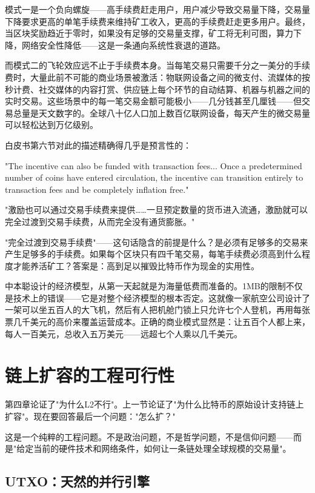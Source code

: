 \documentclass[a4paper,12pt,openany]{ctexbook}
\newenvironment{quoting}{%
  \par\vspace{0.5em}%
  \begin{list}{}{%
    \setlength{\leftmargin}{2em}%
    \setlength{\rightmargin}{2em}%
    \setlength{\parsep}{0.3em}%
    \setlength{\itemsep}{0pt}%
    \setlength{\topsep}{0pt}%
  }%
  \item\relax
}{%
  \end{list}%
  \par\vspace{0.5em}%
}
\begin{document}
模式一是一个负向螺旋——高手续费赶走用户，用户减少导致交易量下降，交易量下降要求更高的单笔手续费来维持矿工收入，更高的手续费赶走更多用户。最终，当区块奖励趋近于零时，如果没有足够的交易量支撑，矿工将无利可图，算力下降，网络安全性降低——这是一条通向系统性衰退的道路。

而模式二的飞轮效应远不止于手续费本身。当每笔交易只需要千分之一美分的手续费时，大量此前不可能的商业场景被激活：物联网设备之间的微支付、流媒体的按秒计费、社交媒体的内容打赏、供应链上每个环节的自动结算、机器与机器之间的实时交易。这些场景中的每一笔交易金额可能极小——几分钱甚至几厘钱——但交易总量是天文数字的。全球八十亿人口加上数百亿联网设备，每天产生的微交易量可以轻松达到万亿级别。

白皮书第六节对此的描述精确得几乎是预言性的：


\begin{quoting}
\small
"The incentive can also be funded with transaction fees... Once a predetermined number of coins have entered circulation, the incentive can transition entirely to transaction fees and be completely inflation free."

"激励也可以通过交易手续费来提供……一旦预定数量的货币进入流通，激励就可以完全过渡到交易手续费，从而完全没有通货膨胀。"
\end{quoting}


"完全过渡到交易手续费"——这句话隐含的前提是什么？是必须有足够多的交易来产生足够多的手续费。如果每个区块只有四千笔交易，每笔手续费必须高到什么程度才能养活矿工？答案是：高到足以摧毁比特币作为现金的实用性。

中本聪设计的经济模型，从第一天起就是为海量低费而准备的。1MB的限制不仅是技术上的错误——它是对整个经济模型的根本否定。这就像一家航空公司设计了一架可以坐五百人的大飞机，然后有人把机舱门锁上只允许七个人登机，再用每张票几千美元的高价来覆盖运营成本。正确的商业模式显然是：让五百个人都上来，每人一百美元，总收入五万美元——远超七个人乘以几千美元。


\section*{链上扩容的工程可行性}


第四章论证了"为什么L2不行"。上一节论证了"为什么比特币的原始设计支持链上扩容"。现在要回答最后一个问题："怎么扩？"

这是一个纯粹的工程问题。不是政治问题，不是哲学问题，不是信仰问题——而是"给定当前的硬件技术和网络条件，如何让一条链处理全球规模的交易量"。


\subsection*{UTXO：天然的并行引擎}
\end{document}
